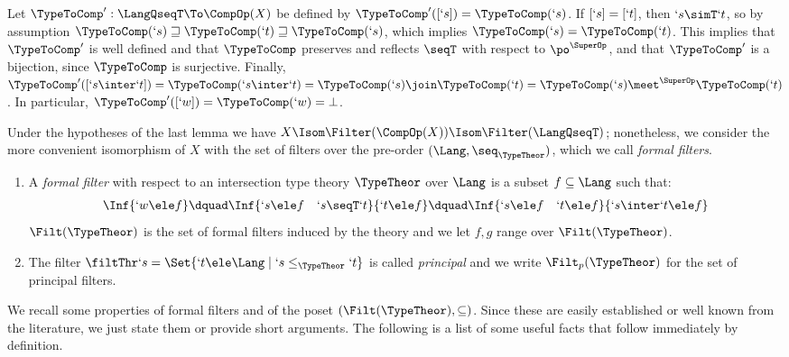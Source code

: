 \documentclass{CSML}
\begin{document}
 \begin{Proof}
Let $ \TypeToComp': \LangQseqT \To \CompOp(X)$ be defined by $ \TypeToComp'([`s]) = \TypeToComp(`s)$.
If $[`s] = [`t]$, then $`s \simT `t$, so by assumption $ \TypeToComp(`s) \sqsupseteq \TypeToComp(`t) \sqsupseteq \TypeToComp(`s)$, which implies $ \TypeToComp(`s) = \TypeToComp(`t)$. 
This implies that $ \TypeToComp'$ is well defined and that $\TypeToComp$ preserves and reflects $\seqT$ with respect to $ \po^{\SuperOp}$, and that $\TypeToComp'$ is a bijection, since $ \TypeToComp$ is surjective. 
Finally, $ \TypeToComp'([`s \inter `t]) = \TypeToComp(`s \inter `t) = \TypeToComp(`s) \join \TypeToComp(`t) = \TypeToComp(`s) \meet^{\SuperOp} \TypeToComp(`t)$. 
In particular, $ \TypeToComp'([`w]) = \TypeToComp(`w) = \bot$.
 \end{Proof}


Under the hypotheses of the last lemma we have $X \Isom \Filter(\CompOp(X)) \Isom \Filter(\LangQseqT)$; nonetheless, we consider the more convenient isomorphism of $X$ with the set of filters over the pre-order $(\Lang,\seq_{\TypeTheor})$, which we call \emph{formal filters}.

 \begin{defi} \label{def:formal-filt}\hfill
 \begin{enumerate}

 \item
A \emph{formal filter} with respect to an intersection type theory $\TypeTheor$ over $\Lang$ is a subset $f\subseteq\Lang$ such that:
%
 \[ \begin{array}{c@{\dquad}c@{\dquad}c} 
\Inf{`w \ele f} &
\Inf{`s \ele f \quad `s \seqT`t }{`t \ele f} &
\Inf{`s \ele f \quad `t \ele f }{`s \inter `t \ele f}
 \end{array} \]
%
$\Filt(\TypeTheor)$ is the set of formal filters induced by the theory and we let $f,g$ range over $\Filt(\TypeTheor)$.

 \item 
The filter $ \filtThr `s = \Set{`t \ele \Lang \mid `s \le_{\TypeTheor} `t}$ is called \emph{principal} and we write $\Filt_p(\TypeTheor)$ for the set of principal filters.

 \end{enumerate}
 \end{defi}

\noindent We recall some properties of formal filters and of the poset $(\Filt(\TypeTheor),\subseteq)$. 
Since these are easily established or well known from the literature, we just state them or provide short arguments. 
The following is a list of some useful facts that follow immediately by definition. 
\end{document}
